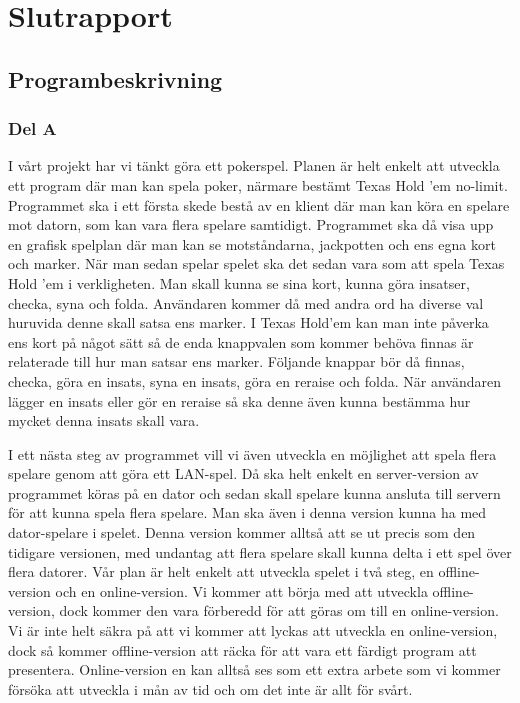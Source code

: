 \documentclass[10pt,a4paper]{article}
\begin{document}
\section*{Slutrapport}

\subsection*{Programbeskrivning}

\subsubsection*{Del A}

I vårt projekt har vi tänkt göra ett pokerspel. Planen är helt enkelt att
utveckla ett program där man kan spela poker, närmare bestämt Texas Hold
’em no-limit. Programmet ska i ett första skede bestå av en klient där man
kan köra en spelare mot datorn, som kan vara flera spelare samtidigt.
Programmet ska då visa upp en grafisk spelplan där man kan se motståndarna,
jackpotten och ens egna kort och marker. När man sedan spelar spelet ska
det sedan vara som att spela Texas Hold ’em i verkligheten. Man skall kunna
se sina kort, kunna göra insatser, checka, syna och folda. Användaren
kommer då med andra ord ha diverse val huruvida denne skall satsa ens
marker. I Texas Hold’em kan man inte påverka ens kort på något sätt så de
enda knappvalen som kommer behöva finnas är relaterade till hur man satsar
ens marker. Följande knappar bör då finnas, checka, göra en insats, syna en
insats, göra en reraise och folda. När användaren lägger en insats eller
gör en reraise så ska denne även kunna bestämma hur mycket denna insats
skall vara.

I ett nästa steg av programmet vill vi även utveckla en möjlighet att spela
flera spelare genom att göra ett LAN-spel. Då ska helt enkelt en
server-version av programmet köras på en dator och sedan skall spelare
kunna ansluta till servern för att kunna spela flera spelare. Man ska även
i denna version kunna ha med dator-spelare i spelet. Denna version kommer
alltså att se ut precis som den tidigare versionen, med undantag att flera
spelare skall kunna delta i ett spel över flera datorer. Vår plan är helt
enkelt att utveckla spelet i två steg, en offline-version och en
online-version. Vi kommer att börja med att utveckla offline-version, dock
kommer den vara förberedd för att göras om till en online-version. Vi är
inte helt säkra på att vi kommer att lyckas att utveckla en online-version,
dock så kommer offline-version att räcka för att vara ett färdigt program
att presentera. Online-version en kan alltså ses som ett extra arbete som
vi kommer försöka att utveckla i mån av tid och om det inte är allt för
svårt.
\end{document}
